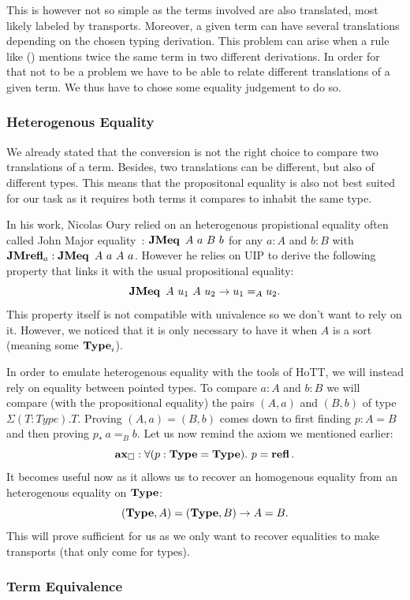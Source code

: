 \documentclass[11pt]{article}
\theoremstyle{plain}
\theoremstyle{remark}
\begin{document}
This is however not so simple as the terms involved are also translated,
most likely labeled by transports. Moreover, a given term can have
several translations depending on the chosen typing derivation.
This problem can arise when a rule like () mentions twice the
same term in two different derivations.
In order for that not to be a problem we have to be able to relate different
translations of a given term. We thus have to chose some equality judgement
to do so.

\subsubsection{Heterogenous Equality}

We already stated that the conversion is not the right choice to compare two
translations of a term.
Besides, two translations can be different, but also of different types.
This means that the propositonal equality is also not best suited for our task
as it requires both terms it compares to inhabit the same type.

In his work, Nicolas Oury relied on an heterogenous propistional equality
often called John Major equality~\cite{mcbride2000dependently}:
$\operatorname{\mathbf{JMeq}}\ A\ a\ B\ b$ for any $a : A$ and $b: B$
with $\operatorname{\mathbf{JMrefl}}_a : \operatorname{\mathbf{JMeq}}\ A\ a\ A\ a$.
However he relies on UIP to derive the following property that links it with
the usual propositional equality:
\[\operatorname{\mathbf{JMeq}}\ A\ u_1\ A\ u_2 \to u_1 =_A u_2.\]
This property itself is not compatible with univalence so we don't want to rely
on it. However, we noticed that it is only necessary to have it when $A$ is a
sort (meaning some $\operatorname{\mathbf{Type}}_i$).

In order to emulate heterogenous equality with the tools of HoTT, we will
instead rely on equality between pointed types.
To compare $a : A$ and $b : B$ we will compare (with the propositional equality)
the pairs $(A,a)$ and $(B,b)$ of type $\Sigma (T : Type).T$.
Proving $(A,a) = (B,b)$ comes down to first finding $p : A = B$ and then
proving $p_*\ a =_B b$.
Let us now remind the axiom we mentioned earlier:
\[ \operatorname{\mathbf{ax}_\square} : \forall (p : \operatorname{\mathbf{Type}} = \operatorname{\mathbf{Type}}).\ p = \operatorname{\mathbf{refl}}. \]
It becomes useful now as it allows us to recover an homogenous equality from
an heterogenous equality on $\operatorname{\mathbf{Type}}$:
\[ (\operatorname{\mathbf{Type}}, A) = (\operatorname{\mathbf{Type}}, B) \to A = B. \]
This will prove sufficient for us as we only want to recover equalities to
make transports (that only come for types).

\subsubsection{Term Equivalence}
\end{document}
